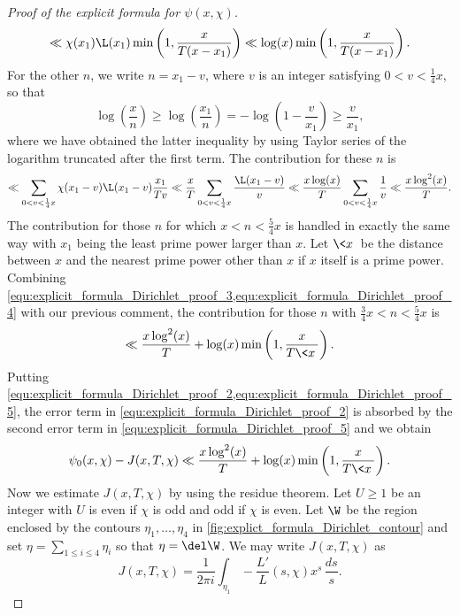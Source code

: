 \begin{proof}[Proof of the explicit formula for $\psi(x,\chi)$]
\begin{equation}
          \ll \chi(x_{1})\L(x_{1})\min\left(1,\frac{x}{T(x-x_{1})}\right) \ll \log(x)\min\left(1,\frac{x}{T(x-x_{1})}\right).
        \end{equation}
        For the other $n$, we write $n = x_{1}-v$, where $v$ is an integer satisfying $0 < v < \frac{1}{4}x$, so that
        \[
          \log\left(\frac{x}{n}\right) \ge \log\left(\frac{x_{1}}{n}\right) = -\log\left(1-\frac{v}{x_{1}}\right) \ge \frac{v}{x_{1}},
        \]
        where we have obtained the latter inequality by using Taylor series of the logarithm truncated after the first term. The contribution for these $n$ is
        \begin{equation}\label{equ:explicit_formula_Dirichlet_proof_4}
          \ll \sum_{0 < v < \frac{1}{4}x}\chi(x_{1}-v)\L(x_{1}-v)\frac{x_{1}}{Tv} \ll \frac{x}{T}\sum_{0 < v < \frac{1}{4}x}\frac{\L(x_{1}-v)}{v} \ll \frac{x\log(x)}{T}\sum_{0 < v < \frac{1}{4}x}\frac{1}{v} \ll \frac{x\log^{2}(x)}{T}.
        \end{equation}
        The contribution for those $n$ for which $x < n < \frac{5}{4}x$ is handled in exactly the same way with $x_{1}$ being the least prime power larger than $x$. Let $\<x\>$ be the distance between $x$ and the nearest prime power other than $x$ if $x$ itself is a prime power. Combining \cref{equ:explicit_formula_Dirichlet_proof_3,equ:explicit_formula_Dirichlet_proof_4} with our previous comment, the contribution for those $n$ with $\frac{3}{4}x < n < \frac{5}{4}x$ is
        \begin{equation}\label{equ:explicit_formula_Dirichlet_proof_5}
          \ll \frac{x\log^{2}(x)}{T}+\log(x)\min\left(1,\frac{x}{T\<x\>}\right).
        \end{equation}
        Putting \cref{equ:explicit_formula_Dirichlet_proof_2,equ:explicit_formula_Dirichlet_proof_5}, the error term in \cref{equ:explicit_formula_Dirichlet_proof_2} is absorbed by the second error term in \cref{equ:explicit_formula_Dirichlet_proof_5} and we obtain
        \begin{equation}\label{equ:explicit_formula_Dirichlet_proof_6}
          \psi_{0}(x,\chi)-J(x,T,\chi) \ll \frac{x\log^{2}(x)}{T}+\log(x)\min\left(1,\frac{x}{T\<x\>}\right).
        \end{equation}
        Now we estimate $J(x,T,\chi)$ by using the residue theorem. Let $U \ge 1$ be an integer with $U$ is even if $\chi$ is odd and odd if $\chi$ is even. Let $\W$ be the region enclosed by the contours $\eta_{1},\ldots,\eta_{4}$ in \cref{fig:explict_formula_Dirichlet_contour} and set $\eta = \sum_{1 \le i \le 4}\eta_{i}$ so that $\eta = \del \W$. We may write $J(x,T,\chi)$ as
        \[
          J(x,T,\chi) = \frac{1}{2\pi i}\int_{\eta_{1}}-\frac{L'}{L}(s,\chi)x^{s}\,\frac{ds}{s}.
        \]


\end{proof}
